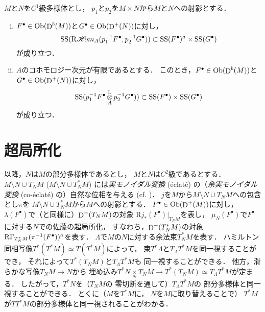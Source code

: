 \begin{PRP}
    \(M\)と\(N\)を\(C^1\)級多様体とし，
    \(p_1\)と\(p_2\)を\(M\times N\)から\(M\)と\(N\)への射影とする．
    \begin{enumerate}[(i)]
        \item \(F^\bullet\in\mathop{\textrm{Ob}}\nolimits(\mathop{\mathrm{D}}\nolimits^b(M))\)と\(G^\bullet\in\mathop{\textrm{Ob}}\nolimits(\mathop{\mathrm{D}}\nolimits^+(N))\)に対し，\[
            \mathop{\mathrm{SS}}\nolimits(\mathop{\mathrm{R}\hspace{-1.5pt}\mathop{\mathscr{H}\hspace{-2pt}om}\nolimits}\nolimits_A(p_1^{-1}F^\bullet,p_2^{-1}G^\bullet))\subset\mathop{\mathrm{SS}}\nolimits(F^\bullet)^a\times\mathop{\mathrm{SS}}\nolimits(G^\bullet)
        \]が成り立つ．
        \item \(A\)のコホモロジー次元が有限であるとする．
        このとき，\(F^\bullet\in\mathop{\textrm{Ob}}\nolimits(\mathop{\mathrm{D}}\nolimits^b(M))\)と\(G^\bullet\in\mathop{\textrm{Ob}}\nolimits(\mathop{\mathrm{D}}\nolimits^+(N))\)に対し，\[
            \mathop{\mathrm{SS}}\nolimits(p_1^{-1}F^\bullet\mathop{\otimes}\limits^\mathrm{L}_A p_2^{-1}G^\bullet))\subset\mathop{\mathrm{SS}}\nolimits(F^\bullet)\times\mathop{\mathrm{SS}}\nolimits(G^\bullet)
        \]が成り立つ．  
    \end{enumerate}
\end{PRP}

\section{超局所化}

以降，\(N\)は\(M\)の部分多様体であるとし，
\(M\)と\(N\)は\(C^2\)級であるとする．
\(M\setminus N \cup T_NM\) (\(M\setminus N \cup T^\ast_NM\)) 
には\emph{実モノイダル変換} (\'eclat\'e) の（\emph{余実モノイダル変換} 
(co-\'eclat\'e) の）自然な位相を与える (cf. \cite{SKK})．
\(j\)を\(M\)から\(M\setminus N \cup T_NM\)への包含とし\(\pi\)を
\(M\setminus N \cup T^\ast_NM\)から\(M\)への射影とする．
\(F^\bullet\in\mathop{\textrm{Ob}}\nolimits(\mathop{\mathrm{D}}\nolimits^+(M))\)に対し，
\(\lambda(F^\bullet)\)で（\cite{Mal}と同様に）\(\mathop{\mathrm{D}}\nolimits^+(T_NM)\)の対象
\(\mathrm{R}j_\ast(F^\bullet)\rvert_{T_NM}\)を表し，
\(\mu_N(F^\bullet)\)で\(F^\bullet\)に対する\(N\)での佐藤の超局所化，
すなわち，\(\mathop{\mathrm{D}}\nolimits^+(T^\ast_NM)\)の対象\(\mathop{\mathrm{R}\hspace{-0pt}\Gamma}\nolimits_{T^\ast_NM}(\pi^{-1}(F^\bullet))^a\)を表す．
\(\Lambda\)で\(M\)の\(N\)に対する余法束\(T_N^\ast M\)を表す．
ハミルトン同相写像\(T^\ast(T^\ast M)\simeq T(T^\ast M)\)によって，
束\(T^\ast\Lambda\)と\(T_\Lambda T^\ast M\)を同一視することができ，
それによって\(T^\ast(T_N M)\)と\(T_\Lambda T^\ast M\)も
同一視することができる．
他方，滑らかな写像\(T_N M\to N\)から
埋め込み\(T^\ast N\mathop{\times}\limits_{N}T_N M
\to T^\ast(T_N M)\simeq T_\Lambda T^\ast M\)が定まる．
したがって，\(T^\ast{N}\)を（\(T_{N}M\)の
零切断を通して）\(T_{\Lambda}T^{\ast}M\)の
部分多様体と同一視することができる．
とくに（\(M\)を\(T^\ast M\)に，
\(N\)を\(M\)に取り替えることで）
\(T^\ast M\)が\(TT^\ast M\)の部分多様体と同一視されることがわかる．

